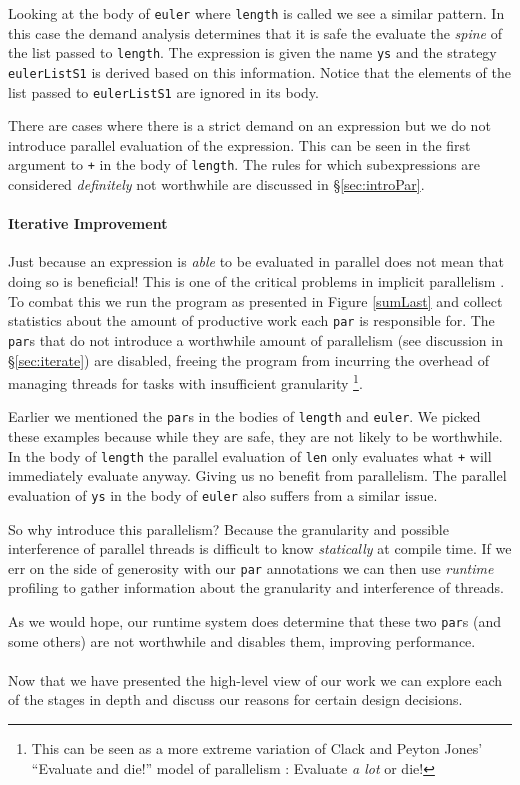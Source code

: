 Looking at the body of \verb-euler- where \verb-length- is called we see a
similar pattern. In this case the demand analysis determines that it is
safe the evaluate the \emph{spine} of the list passed to \verb-length-.
The expression is given the name \verb-ys- and the strategy \verb-eulerListS1-
is derived based on this information. Notice that the elements of the list
passed to \verb-eulerListS1- are ignored in its body. 

There are cases where there is a strict demand on an expression but we
do not introduce parallel evaluation of the expression. This can be seen
in the first argument to \verb-+- in the body of \verb-length-. The rules
for which subexpressions are considered \emph{definitely} not worthwhile
are discussed in \S\ref{sec:introPar}.

\paragraph{Iterative Improvement}

Just because an expression is \emph{able} to be evaluated in parallel does not
mean that doing so is beneficial! This is one of the critical problems in
implicit parallelism \citep{hogen1992automatic, hammond2000research,
Jones2009Tuning}. To combat this we run the program as presented in Figure
\ref{sumLast} and collect statistics about the amount of productive work
each \verb-par- is responsible for. The \verb-par-s that do not introduce
a worthwhile amount of parallelism (see discussion in \S\ref{sec:iterate})
are disabled, freeing the program from incurring the overhead of managing
threads for tasks with insufficient granularity \footnote{This can be seen
as a more extreme variation of Clack and Peyton Jones' ``Evaluate and die!''
model of parallelism \citep{clack1986four}: Evaluate \emph{a lot} or die!}.

Earlier we mentioned the \verb-par-s in the bodies of \verb-length- and
\verb-euler-. We picked these examples because while they are safe, they are
not likely to be worthwhile. In the body of \verb-length- the parallel
evaluation of \verb-len- only evaluates what \verb-+- will immediately evaluate
anyway. Giving us no benefit from parallelism. The parallel evaluation of
\verb-ys- in the body of \verb-euler- also suffers from a similar issue.

So why introduce this parallelism? Because the granularity and possible
interference of parallel threads is difficult to know \emph{statically} at
compile time. If we err on the side of generosity with our \verb-par-
annotations we can then use \emph{runtime} profiling to gather information
about the granularity and interference of threads. 

As we would hope, our runtime system does determine that these two \verb-par-s (and some
others) are not worthwhile and disables them, improving performance.

\paragraph{}

Now that we have presented the high-level view of our work we can explore each of
the stages in depth and discuss our reasons for certain design decisions.
